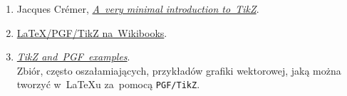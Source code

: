 \documentclass[a4paper,11pt]{article}
\begin{document}
\begin{enumerate}
\item Jacques Cr\'{e}mer,
  \href{http://cremeronline.com/LaTeX/minimaltikz.pdf}{\emph{A~very
      minimal introduction to~TikZ}}.

\item
  \href{https://en.wikibooks.org/wiki/LaTeX/PGF/TikZ}{\LaTeX/PGF/TikZ
    na~Wikibooks}.

\item \href{http://www.texample.net/tikz/examples/}{\emph{TikZ and~PGF~examples}}. \\
  Zbiór, często oszałamiających, przykładów grafiki wektorowej, jaką
  można tworzyć w~\LaTeX u za~pomocą \texttt{PGF/TikZ}.
\end{enumerate}






\end{document}
